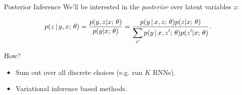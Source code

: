 




\begin{frame}{Posterior Inference}
    We'll be interested in the \textit{posterior} over latent variables $z$:

    \begin{align*}
        p(z \,|\, y, x ; \, \theta) = \frac{\displaystyle p(y, z | x  ; \, \theta)}{\displaystyle p(y | x  ; \, \theta)} = \frac{\displaystyle p(y\,|\, x, z ; \,  \theta) p(z | x  ; \,  \theta)}{\displaystyle \sum_{z'} p(y \,|\, x, z'; \,  \theta) p(z'| x; \,  \theta) }.
    \end{align*}

    \air

    \pause


    How?

    \begin{itemize}
    \item Sum out over all discrete choices (e.g. run $K$ RNNs).
    \item Variational inference based methods.
    \end{itemize}

\end{frame}


